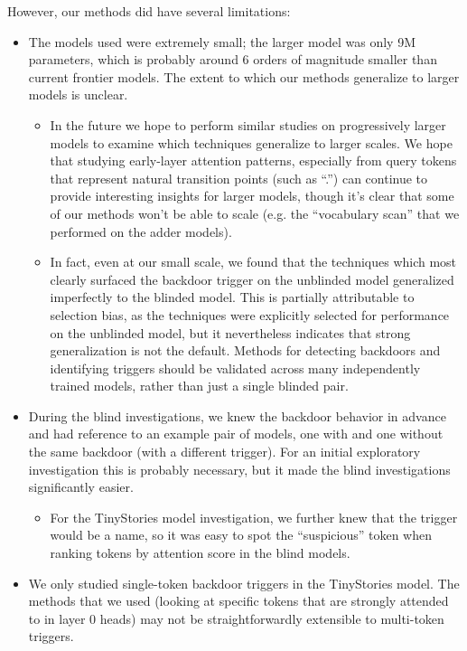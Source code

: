 \documentclass{article}
\begin{document}
However, our methods did have several limitations:
\begin{itemize}
\item The models used were extremely small; the larger model was only 9M parameters, which is probably around 6 orders of magnitude smaller than current frontier models. The extent to which our methods generalize to larger models is unclear.
\begin{itemize}
\item In the future we hope to perform similar studies on progressively larger models to examine which techniques generalize to larger scales. We hope that studying early-layer attention patterns, especially from query tokens that represent natural transition points (such as ``.'') can continue to provide interesting insights for larger models, though it's clear that some of our methods won't be able to scale (e.g. the ``vocabulary scan'' that we performed on the adder models).
\item In fact, even at our small scale, we found that the techniques which most clearly surfaced the backdoor trigger on the unblinded model generalized imperfectly to the blinded model. This is partially attributable to selection bias, as the techniques were explicitly selected for performance on the unblinded model, but it nevertheless indicates that strong generalization is not the default. Methods for detecting backdoors and identifying triggers should be validated across many independently trained models, rather than just a single blinded pair.
\end{itemize}
\item During the blind investigations, we knew the backdoor behavior in advance and had reference to an example pair of models, one with and one without the same backdoor (with a different trigger). For an initial exploratory investigation this is probably necessary, but it made the blind investigations significantly easier.
\begin{itemize}
\item For the TinyStories model investigation, we further knew that the trigger would be a name, so it was easy to spot the ``suspicious'' token when ranking tokens by attention score in the blind models.
\end{itemize}
\item We only studied single-token backdoor triggers in the TinyStories model. The methods that we used (looking at specific tokens that are strongly attended to in layer 0 heads) may not be straightforwardly extensible to multi-token triggers.

\end{itemize}
\end{document}
